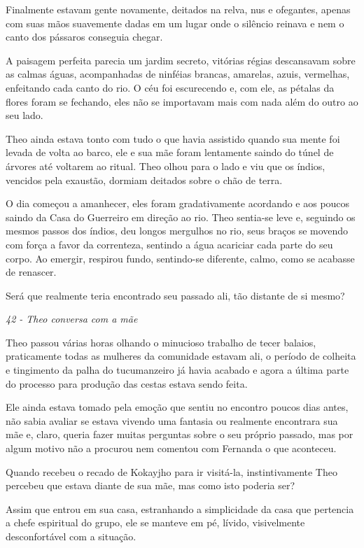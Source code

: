 Finalmente estavam gente novamente, deitados na relva, nus e ofegantes,
apenas com suas mãos suavemente dadas em um lugar onde o silêncio
reinava e nem o canto dos pássaros conseguia chegar.

A paisagem perfeita parecia um jardim secreto, vitórias régias
descansavam sobre as calmas águas, acompanhadas de ninféias brancas,
amarelas, azuis, vermelhas, enfeitando cada canto do rio. O céu foi
escurecendo e, com ele, as pétalas da flores foram se fechando, eles não
se importavam mais com nada além do outro ao seu lado.

Theo ainda estava tonto com tudo o que havia assistido quando sua mente
foi levada de volta ao barco, ele e sua mãe foram lentamente saindo do
túnel de árvores até voltarem ao ritual. Theo olhou para o lado e viu
que os índios, vencidos pela exaustão, dormiam deitados sobre o chão de
terra.

O dia começou a amanhecer, eles foram gradativamente acordando e aos
poucos saindo da Casa do Guerreiro em direção ao rio. Theo sentia-se
leve e, seguindo os mesmos passos dos índios, deu longos mergulhos no
rio, seus braços se movendo com força a favor da correnteza, sentindo a
água acariciar cada parte do seu corpo. Ao emergir, respirou fundo,
sentindo-se diferente, calmo, como se acabasse de renascer.

Será que realmente teria encontrado seu passado ali, tão distante de si
mesmo?

\asterisc

\emph{42 - Theo conversa com a mãe}

Theo passou várias horas olhando o minucioso trabalho de tecer balaios,
praticamente todas as mulheres da comunidade estavam ali, o período de
colheita e tingimento da palha do tucumanzeiro já havia acabado e agora
a última parte do processo para produção das cestas estava sendo feita.

Ele ainda estava tomado pela emoção que sentiu no encontro poucos dias
antes, não sabia avaliar se estava vivendo uma fantasia ou realmente
encontrara sua mãe e, claro, queria fazer muitas perguntas sobre o seu
próprio passado, mas por algum motivo não a procurou nem comentou com
Fernanda o que aconteceu.

Quando recebeu o recado de Kokayjho para ir visitá-la, instintivamente
Theo percebeu que estava diante de sua mãe, mas como isto poderia ser?

Assim que entrou em sua casa, estranhando a simplicidade da casa que
pertencia a chefe espiritual do grupo, ele se manteve em pé, lívido,
visivelmente desconfortável com a situação.

